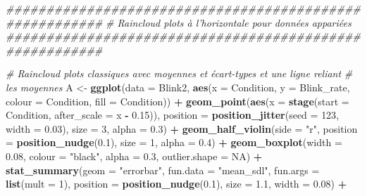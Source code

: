 \documentclass[
  french,
]{book}
\newenvironment{Shaded}{\begin{snugshade}}{\end{snugshade}}
\newcommand{\CommentTok}[1]{\textcolor[rgb]{0.56,0.35,0.01}{\textit{#1}}}
\newcommand{\DataTypeTok}[1]{\textcolor[rgb]{0.13,0.29,0.53}{#1}}
\newcommand{\DecValTok}[1]{\textcolor[rgb]{0.00,0.00,0.81}{#1}}
\newcommand{\FloatTok}[1]{\textcolor[rgb]{0.00,0.00,0.81}{#1}}
\newcommand{\KeywordTok}[1]{\textcolor[rgb]{0.13,0.29,0.53}{\textbf{#1}}}
\newcommand{\NormalTok}[1]{#1}
\newcommand{\OperatorTok}[1]{\textcolor[rgb]{0.81,0.36,0.00}{\textbf{#1}}}
\newcommand{\OtherTok}[1]{\textcolor[rgb]{0.56,0.35,0.01}{#1}}
\newcommand{\StringTok}[1]{\textcolor[rgb]{0.31,0.60,0.02}{#1}}
\begin{document}
\begin{Shaded}
\begin{Highlighting}[]
\CommentTok{########################################################}
\CommentTok{# Raincloud plots à l'horizontale pour données appariées}
\CommentTok{########################################################}

\CommentTok{# Raincloud plots classiques avec moyennes et écart-types et une ligne reliant }
\CommentTok{# les moyennes}
\NormalTok{A <-}
\StringTok{  }\KeywordTok{ggplot}\NormalTok{(}\DataTypeTok{data =}\NormalTok{ Blink2, }\KeywordTok{aes}\NormalTok{(}\DataTypeTok{x =}\NormalTok{ Condition, }\DataTypeTok{y =}\NormalTok{ Blink_rate,  }
                            \DataTypeTok{colour =}\NormalTok{ Condition, }\DataTypeTok{fill =}\NormalTok{ Condition)) }\OperatorTok{+}
\StringTok{  }\KeywordTok{geom_point}\NormalTok{(}\KeywordTok{aes}\NormalTok{(}\DataTypeTok{x =} \KeywordTok{stage}\NormalTok{(}\DataTypeTok{start =}\NormalTok{ Condition, }\DataTypeTok{after_scale =}\NormalTok{ x }\OperatorTok{-}\StringTok{ }\FloatTok{0.15}\NormalTok{)),}
             \DataTypeTok{position =} \KeywordTok{position_jitter}\NormalTok{(}\DataTypeTok{seed =} \DecValTok{123}\NormalTok{, }\DataTypeTok{width =} \FloatTok{0.03}\NormalTok{),}
             \DataTypeTok{size =} \DecValTok{3}\NormalTok{, }\DataTypeTok{alpha =} \FloatTok{0.3}\NormalTok{) }\OperatorTok{+}
\StringTok{  }\KeywordTok{geom_half_violin}\NormalTok{(}\DataTypeTok{side =} \StringTok{"r"}\NormalTok{, }
                   \DataTypeTok{position =} \KeywordTok{position_nudge}\NormalTok{(}\FloatTok{0.1}\NormalTok{), }
                   \DataTypeTok{size =} \DecValTok{1}\NormalTok{, }\DataTypeTok{alpha =} \FloatTok{0.4}\NormalTok{) }\OperatorTok{+}\StringTok{  }
\StringTok{  }\KeywordTok{geom_boxplot}\NormalTok{(}\DataTypeTok{width =} \FloatTok{0.08}\NormalTok{, }\DataTypeTok{colour =} \StringTok{"black"}\NormalTok{, }\DataTypeTok{alpha =} \FloatTok{0.3}\NormalTok{, }
               \DataTypeTok{outlier.shape =} \OtherTok{NA}\NormalTok{) }\OperatorTok{+}\StringTok{ }
\StringTok{  }\KeywordTok{stat_summary}\NormalTok{(}\DataTypeTok{geom =} \StringTok{"errorbar"}\NormalTok{,}
               \DataTypeTok{fun.data =} \StringTok{"mean_sdl"}\NormalTok{,}
               \DataTypeTok{fun.args =} \KeywordTok{list}\NormalTok{(}\DataTypeTok{mult =} \DecValTok{1}\NormalTok{),}
               \DataTypeTok{position =} \KeywordTok{position_nudge}\NormalTok{(}\FloatTok{0.1}\NormalTok{), }
               \DataTypeTok{size =} \FloatTok{1.1}\NormalTok{, }\DataTypeTok{width =} \FloatTok{0.08}\NormalTok{) }\OperatorTok{+}

\end{Highlighting}
\end{Shaded}
\end{document}
